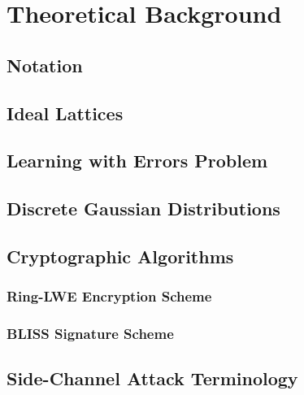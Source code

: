 %
%

\chapter{Theoretical Background}

\section{Notation}

\section{Ideal Lattices}

\section{Learning with Errors Problem}

\section{Discrete Gaussian Distributions}

\section{Cryptographic Algorithms}

\subsection{Ring-LWE Encryption Scheme}

\subsection{BLISS Signature Scheme}

\section{Side-Channel Attack Terminology}